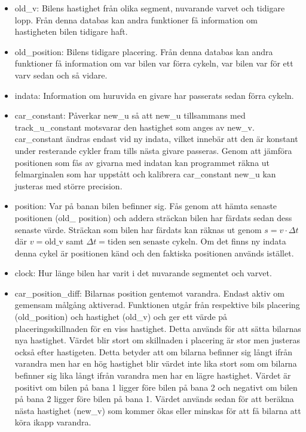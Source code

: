     \begin{itemize}
      
      \item old\_v: Bilens hastighet från olika segment, nuvarande varvet och
        tidigare lopp. Från denna databas kan andra funktioner få information
        om hastigheten bilen tidigare haft.
      
      \item old\_position: Bilens tidigare placering. Från denna databas kan
        andra funktioner få information om var bilen var förra cykeln, var
        bilen var för ett varv sedan och så vidare.

      \item indata: Information om huruvida en givare har passerats sedan förra
        cykeln.
      
      \item car\_constant: Påverkar new\_u så att new\_u tillsammans med
        track\_u\_constant motsvarar den hastighet som anges av new\_v.
        car\_constant ändras endast vid ny indata, vilket innebär att den är
        konstant under resterande cykler fram tills nästa givare passeras.
        Genom att jämföra positionen som fås av givarna med indatan kan
        programmet räkna ut felmarginalen som har uppstått och kalibrera
        car\_constant new\_u kan justeras med större precision.
      
      \item position: Var på banan bilen befinner sig. Fås genom att hämta
        senaste positionen (old\_ position) och addera sträckan bilen har
        färdats sedan dess senaste värde. Sträckan som bilen har färdats kan
        räknas ut genom $s = v \cdot \Delta t$ där $v = \textrm{old\_v}$ samt
        $\Delta t = \textrm{tiden sen senaste cykeln}$. Om det finns ny indata
        denna cykel är positionen känd och den faktiska positionen används
        istället.
      
      \item clock: Hur länge bilen har varit i det nuvarande segmentet och
        varvet.

      \item car\_position\_diff: Bilarnas position gentemot varandra. Endast
        aktiv om gemensam målgång aktiverad. Funktionen utgår från respektive
        bils placering (old\_position) och hastighet (old\_v) och ger ett värde
        på placeringsskillnaden för en viss hastighet. Detta används för att
        sätta bilarnas nya hastighet. Värdet blir stort om skillnaden i
        placering är stor men justeras också efter hastigeten. Detta betyder
        att om bilarna befinner sig långt ifrån varandra men har en hög
        hastighet blir värdet inte lika stort som om bilarna befinner sig lika
        långt ifrån varandra men har en lägre hastighet. Värdet är positivt om
        bilen på bana 1 ligger före bilen på bana 2 och negativt om bilen på
        bana 2 ligger före bilen på bana 1.  Värdet används sedan för att
        beräkna nästa hastighet (new\_v) som kommer ökas eller minskas för att
        få bilarna att köra ikapp varandra. 


\end{itemize}

